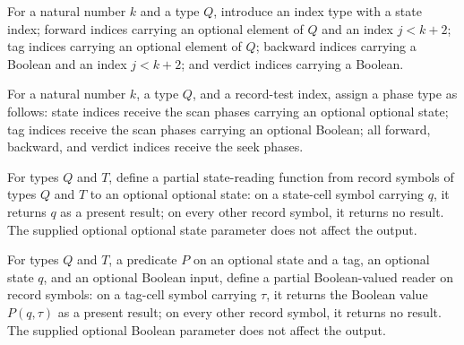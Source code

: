 \begin{definition}
\label{Turing.RecordTestIndex}
\leanok
For a natural number $k$ and a type $Q$, introduce an index type with a state index;
forward indices carrying an optional element of $Q$ and an index $j<k+2$; tag indices
carrying an optional element of $Q$; backward indices carrying a Boolean and an index
$j<k+2$; and verdict indices carrying a Boolean.
\end{definition}

\begin{definition}
\label{Turing.recordTestPhase}
\leanok
{}
For a natural number $k$, a type $Q$, and a record-test index, assign a phase type as
follows: state indices receive the scan phases carrying an optional optional state; tag
indices receive the scan phases carrying an optional Boolean; all forward, backward, and
verdict indices receive the seek phases.
\end{definition}

\begin{definition}
\label{Turing.recordReadState}
\leanok
{}
For types $Q$ and $T$, define a partial state-reading function from record symbols of
types $Q$ and $T$ to an optional optional state: on a state-cell symbol carrying $q$, it
returns $q$ as a present result; on every other record symbol, it returns no result. The
supplied optional optional state parameter does not affect the output.
\end{definition}

\begin{definition}
\label{Turing.recordReadTag}
\leanok
{}
For types $Q$ and $T$, a predicate $P$ on an optional state and a tag, an optional state
$q$, and an optional Boolean input, define a partial Boolean-valued reader on record
symbols: on a tag-cell symbol carrying $\tau$, it returns the Boolean value $P(q,\tau)$
as a present result; on every other record symbol, it returns no result. The supplied
optional Boolean parameter does not affect the output.
\end{definition}

